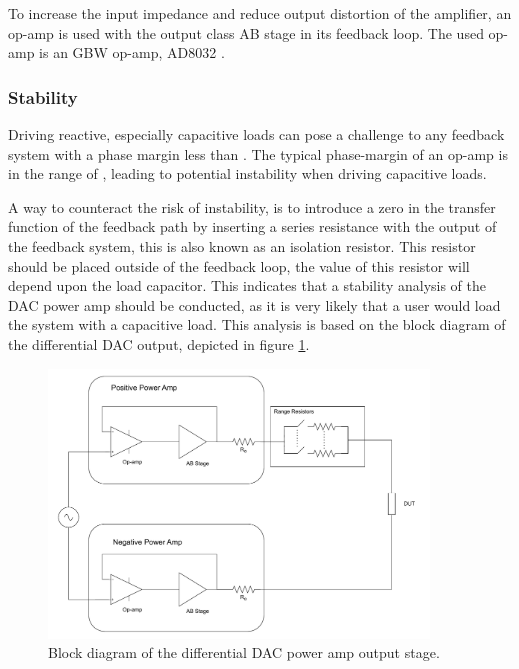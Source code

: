To increase the input impedance and reduce output distortion of the amplifier, an op-amp is used with the output class AB stage in its feedback loop. The used op-amp is an  GBW op-amp, AD8032 \cite{AD8032_datasheet}. 

\subsubsection{Stability}
Driving reactive, especially capacitive loads can pose a challenge to any feedback system with a phase margin less than . The typical phase-margin of an op-amp is in the range of , leading to potential instability when driving capacitive loads.

A way to counteract the risk of instability, is to introduce a zero in the transfer function of the feedback path by inserting a series resistance with the output of the feedback system, this is also known as an isolation resistor. This resistor should be placed outside of the feedback loop, the value of this resistor will depend upon the load capacitor. This indicates that a stability analysis of the DAC power amp should be conducted, as it is very likely that a user would load the system with a capacitive load. This analysis is based on the block diagram of the differential DAC output, depicted in figure \ref{fig_7_1_1_5_DAC_POWER_AMP_BLOCK}. 


\begin{figure}[H]
    \centering
    \includegraphics[clip, trim=0 0 0 0, width=0.9\textwidth]{Sections/7_SystemDesign/Figures/DAC_POWER_BLOCK.pdf}
    \caption{Block diagram of the differential DAC power amp output stage.}
    \label{fig_7_1_1_5_DAC_POWER_AMP_BLOCK}
\end{figure}

